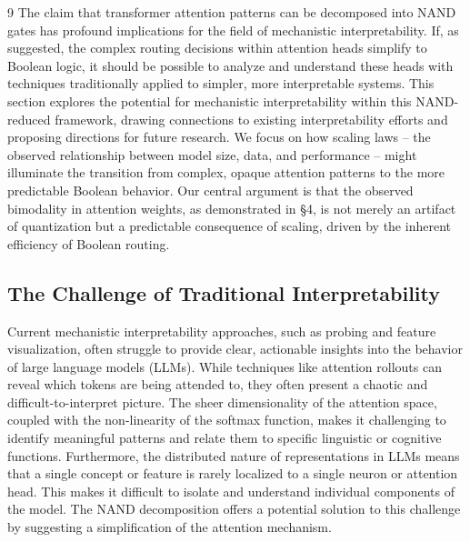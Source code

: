 \documentclass[11pt]{article}
\theoremstyle{definition}
\begin{document}
\begin{thebibliography}{9}
The claim that transformer attention patterns can be decomposed into NAND gates has profound implications for the field of mechanistic interpretability. If, as suggested, the complex routing decisions within attention heads simplify to Boolean logic, it should be possible to analyze and understand these heads with techniques traditionally applied to simpler, more interpretable systems. This section explores the potential for mechanistic interpretability within this NAND-reduced framework, drawing connections to existing interpretability efforts and proposing directions for future research.  We focus on how scaling laws – the observed relationship between model size, data, and performance – might illuminate the transition from complex, opaque attention patterns to the more predictable Boolean behavior.  Our central argument is that the observed bimodality in attention weights, as demonstrated in §4, is not merely an artifact of quantization but a predictable consequence of scaling, driven by the inherent efficiency of Boolean routing.













\subsection{The Challenge of Traditional Interpretability}













Current mechanistic interpretability approaches, such as probing and feature visualization, often struggle to provide clear, actionable insights into the behavior of large language models (LLMs). While techniques like attention rollouts can reveal which tokens are being attended to, they often present a chaotic and difficult-to-interpret picture.  The sheer dimensionality of the attention space, coupled with the non-linearity of the softmax function, makes it challenging to identify meaningful patterns and relate them to specific linguistic or cognitive functions.  Furthermore, the distributed nature of representations in LLMs means that a single concept or feature is rarely localized to a single neuron or attention head.  This makes it difficult to isolate and understand individual components of the model. The NAND decomposition offers a potential solution to this challenge by suggesting a simplification of the attention mechanism.














\end{thebibliography}
\end{document}
